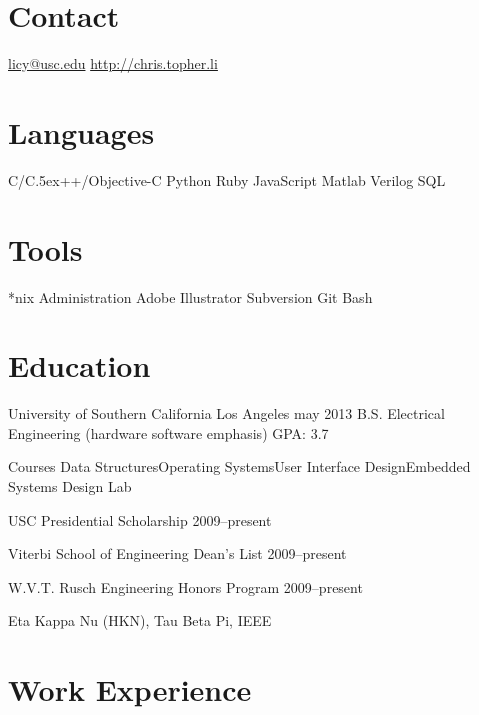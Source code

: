 \documentclass[print]{friggeri-cv}
\def\Cplusplus{{\rm C\raise.5ex\hbox{\small ++}}}
\begin{document}
       {}


\begin{aside}
  \section{Contact}
    \href{mailto:licy@usc.edu}{licy@usc.edu}
    \href{http://chris.topher.li}{http://chris.topher.li}
  \section{Languages}
    C/\Cplusplus/Objective-C
    Python
    Ruby
    JavaScript
    {\sc Matlab}
    Verilog
    SQL
  \section{Tools}
    *nix Administration
    Adobe Illustrator
    Subversion
    Git
    Bash
\end{aside}

\section{Education}

\education
  {University of Southern California}
  {Los Angeles}
  {may 2013}
  {
  B.S. Electrical Engineering (hardware software emphasis) \Space GPA: 3.7
  }

\vspace{-1.0em}
\begin{entrylist}
  \project
    {Courses}
    {Data Structures\Space Operating Systems\Space User Interface Design\Space Embedded Systems Design Lab}
  
  {
    USC Presidential Scholarship 2009--present
  
    Viterbi School of Engineering Dean's List 2009--present
  
    W.V.T. Rusch Engineering Honors Program 2009--present
  }
  
  {
    Eta Kappa Nu (HKN), Tau Beta Pi, IEEE
  }
  
\end{entrylist}

\section{Work Experience}
\end{document}
